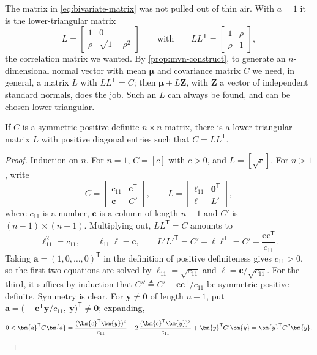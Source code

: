 The matrix in \eqref{eq:bivariate-matrix} was not pulled out of thin air.
With $a=1$ it is the lower-triangular matrix
\[
	L = \begin{bmatrix} 1 & 0 \\ \rho & \sqrt{1-\rho^{2}} \end{bmatrix}
	\qquad\text{with}\qquad
	LL^{\mathsf{T}} = \begin{bmatrix} 1 & \rho \\ \rho & 1 \end{bmatrix} ,
\]
the correlation matrix we wanted.
By \autoref{prop:mvn-construct}, to generate an $n$-dimensional normal vector with mean $\bm{\mu}$ and covariance matrix $C$ we need, in general, a matrix $L$ with $LL^{\mathsf{T}}=C$; then $\bm{\mu}+L\bm{Z}$, with $\bm{Z}$ a vector of independent standard normals, does the job.
Such an $L$ can always be found, and can be chosen lower triangular.

\begin{theorem}\label{thm:cholesky}
	If $C$ is a symmetric positive definite $n\times n$ matrix, there is a lower-triangular matrix $L$ with positive diagonal entries such that $C=LL^{\mathsf{T}}$.
\end{theorem}

\begin{proof}
	Induction on $n$.
	For $n=1$, $C=[c]$ with $c>0$, and $L=[\sqrt{c}]$.
	For $n>1$, write
	\[
		C=\begin{bmatrix} c_{11} & \bm{c}^{\mathsf{T}} \\ \bm{c} & C' \end{bmatrix} ,
		\qquad
		L=\begin{bmatrix} \ell_{11} & \bm{0}^{\mathsf{T}} \\ \bm{\ell} & L' \end{bmatrix} ,
	\]
	where $c_{11}$ is a number, $\bm{c}$ is a column of length $n-1$ and $C'$ is $(n-1)\times(n-1)$.
	Multiplying out, $LL^{\mathsf{T}}=C$ amounts to
	\[
		\ell_{11}^{2}=c_{11} ,
		\qquad
		\ell_{11}\bm{\ell}=\bm{c} ,
		\qquad
		L'L'^{\mathsf{T}}=C'-\bm{\ell}\bm{\ell}^{\mathsf{T}}=C'-\frac{\bm{c}\bm{c}^{\mathsf{T}}}{c_{11}} .
	\]
	Taking $\bm{a}=(1,0,\dots,0)^{\mathsf{T}}$ in the definition of positive definiteness gives $c_{11}>0$, so the first two equations are solved by $\ell_{11}=\sqrt{c_{11}}$ and $\bm{\ell}=\bm{c}/\sqrt{c_{11}}$.
	For the third, it suffices by induction that $C''\triangleq C'-\bm{c}\bm{c}^{\mathsf{T}}/c_{11}$ be symmetric positive definite.
	Symmetry is clear.
	For $\bm{y}\ne\bm{0}$ of length $n-1$, put $\bm{a}=\bigl(-\bm{c}^{\mathsf{T}}\bm{y}/c_{11},\ \bm{y}\bigr)^{\mathsf{T}}\ne\bm{0}$; expanding,
	\[
		0<\bm{a}^{\mathsf{T}}C\bm{a}
		=\frac{(\bm{c}^{\mathsf{T}}\bm{y})^{2}}{c_{11}}-2\,\frac{(\bm{c}^{\mathsf{T}}\bm{y})^{2}}{c_{11}}+\bm{y}^{\mathsf{T}}C'\bm{y}
		=\bm{y}^{\mathsf{T}}C''\bm{y} .
		\qedhere
	\]
\end{proof}

